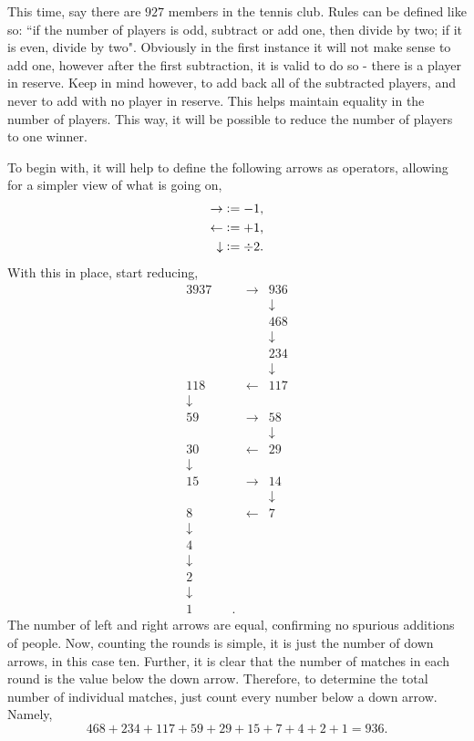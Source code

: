 \documentclass{article}
\begin{document}
\begin{example} \label{Example 1}
    This time, say there are $927$ members in the tennis club. Rules can be defined like so: ``if the number of players is odd, subtract or add one, then divide by two; if it is even, divide by two". Obviously in the first instance it will not make sense to add one, however after the first subtraction, it is valid to do so - there is a player in reserve. Keep in mind however, to add back all of the subtracted players, and never to add with no player in reserve. This helps maintain equality in the number of players. This way, it will be possible to reduce the number of players to one winner.
    
    To begin with, it will help to define the following arrows as operators, allowing for a simpler view of what is going on,
    \begin{align*}
        \rightarrow &\vcentcolon= -1, \\
        \leftarrow &\vcentcolon= +1, \\
        \downarrow &\vcentcolon= \div 2.
    \end{align*}
    With this in place, start reducing, \singlespacing
    \begin{alignat*}{3}
        937&&\ &\rightarrow{} &936 \\
        && & &\downarrow \\
        && & &468 \\
        && & &\downarrow \\
        && & &234 \\
        && & &\downarrow \\
        118&& &\leftarrow &117 \\
        \downarrow&& & & \\
        59&& &\rightarrow &58 \\
        && & &\downarrow \\
        30&& &\leftarrow &29 \\
        \downarrow&& & &\\
        15&& &\rightarrow &14 \\
        && & &\downarrow \\
        8&& & \leftarrow &7 \\
        \downarrow&& & \\
        4&& & & \\
        \downarrow&& & & \\
        2&& & & \\
        \downarrow&& & & \\
        1&&. & &
    \end{alignat*} \doublespacing
    The number of left and right arrows are equal, confirming no spurious additions of people. Now, counting the rounds is simple, it is just the number of down arrows, in this case ten. Further, it is clear that the number of matches in each round is the value below the down arrow. Therefore, to determine the total number of individual matches, just count every number below a down arrow. Namely,
    \begin{equation*}
        468+234+117+59+29+15+7+4+2+1 = 936.
    \end{equation*}
    

\end{example}
\end{document}
